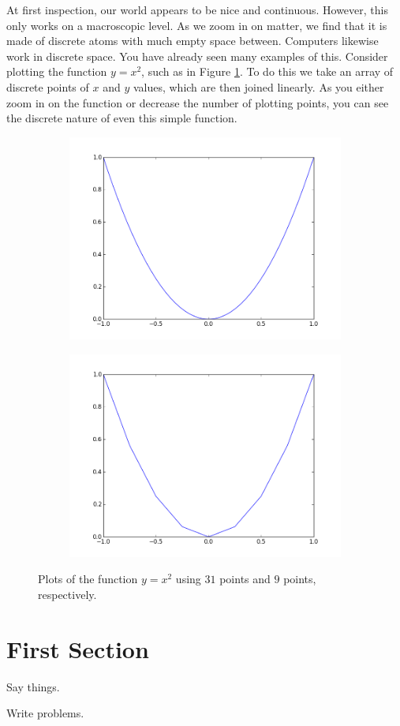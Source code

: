 \label{lab:spgrid}


At first inspection, our world appears to be nice and continuous.  However, this only works on a macroscopic level.  As we zoom in on matter, we find that it is made of discrete atoms with much empty space between.  Computers likewise work in discrete space.  You have already seen many examples of this.  Consider plotting the function $y=x^2$, such as in Figure \ref{fig:x_squared}.  To do this we take an array of discrete points of $x$ and $y$ values, which are then joined linearly.  As you either zoom in on the function or decrease the number of plotting points, you can see the discrete nature of even this simple function. 

\begin{figure}
\begin{subfigure}{.5\textwidth}
\includegraphics[width=\textwidth]{x2.png}
\end{subfigure}
\begin{subfigure}{.5\textwidth}
\includegraphics[width=\textwidth]{x2a.png}
\end{subfigure}
\caption{Plots of the function $y=x^2$ using $31$ points and $9$ points, respectively.}
\label{fig:x_squared}
\end{figure}

\section*{First Section}

Say things.

\begin{problem}
Write problems.
\end{problem}